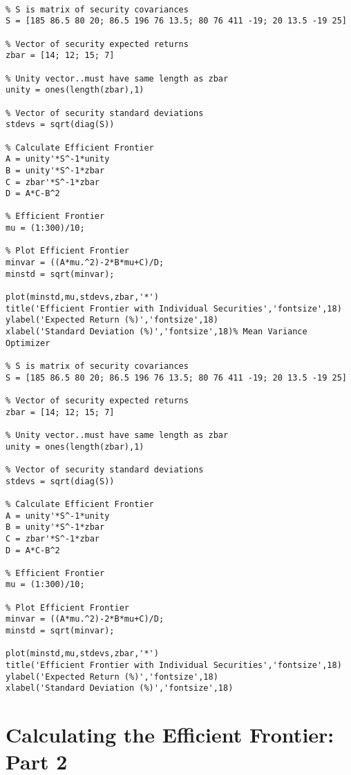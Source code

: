 \documentclass[12pt,a4paper]{article}
\begin{document}
\lstset{language=Matlab}
\begin{lstlisting}[frame=single]
% Mean Variance Optimizer
 
% S is matrix of security covariances
S = [185 86.5 80 20; 86.5 196 76 13.5; 80 76 411 -19; 20 13.5 -19 25]
 
% Vector of security expected returns
zbar = [14; 12; 15; 7]
 
% Unity vector..must have same length as zbar
unity = ones(length(zbar),1)
 
% Vector of security standard deviations
stdevs = sqrt(diag(S))
 
% Calculate Efficient Frontier
A = unity'*S^-1*unity
B = unity'*S^-1*zbar
C = zbar'*S^-1*zbar
D = A*C-B^2
 
% Efficient Frontier
mu = (1:300)/10;
 
% Plot Efficient Frontier
minvar = ((A*mu.^2)-2*B*mu+C)/D;
minstd = sqrt(minvar);
 
plot(minstd,mu,stdevs,zbar,'*')
title('Efficient Frontier with Individual Securities','fontsize',18)
ylabel('Expected Return (%)','fontsize',18)
xlabel('Standard Deviation (%)','fontsize',18)% Mean Variance Optimizer
 
% S is matrix of security covariances
S = [185 86.5 80 20; 86.5 196 76 13.5; 80 76 411 -19; 20 13.5 -19 25]
 
% Vector of security expected returns
zbar = [14; 12; 15; 7]
 
% Unity vector..must have same length as zbar
unity = ones(length(zbar),1)
 
% Vector of security standard deviations
stdevs = sqrt(diag(S))
 
% Calculate Efficient Frontier
A = unity'*S^-1*unity
B = unity'*S^-1*zbar
C = zbar'*S^-1*zbar
D = A*C-B^2
 
% Efficient Frontier
mu = (1:300)/10;
 
% Plot Efficient Frontier
minvar = ((A*mu.^2)-2*B*mu+C)/D;
minstd = sqrt(minvar);
 
plot(minstd,mu,stdevs,zbar,'*')
title('Efficient Frontier with Individual Securities','fontsize',18)
ylabel('Expected Return (%)','fontsize',18)
xlabel('Standard Deviation (%)','fontsize',18)
\end{lstlisting}



\section{Calculating the Efficient Frontier: Part 2}
\end{document}
